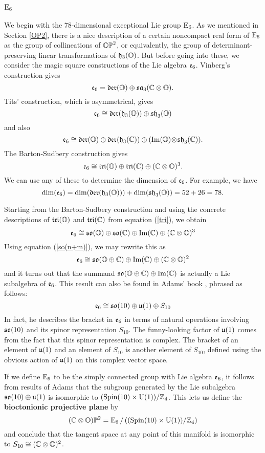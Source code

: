 \subsection{${\rm E}_6$}   \label{E6}   

We begin with the 78-dimensional exceptional Lie group ${\rm E}_6$.     
As we mentioned in Section \ref{OP2}, there is a nice description of a 
certain noncompact real form of ${\rm E}_6$ as the group of collineations
of ${\mathbb {OP}}^2$, or equivalently, the group of determinant-preserving 
linear transformations of ${\mathfrak {h}}_3({\mathbb O})$.  But before going into these,
we consider the magic square constructions of the Lie algebra ${\mathfrak {e}}_6$.
Vinberg's construction gives 
\[
{\mathfrak {e}}_6 = {\mathfrak {der}}({\mathbb O}) \oplus {\mathfrak {sa}}_3({\mathbb C} \otimes {\mathbb O})  .
\label{e6.1}
\]
Tits' construction, which is asymmetrical, gives
\[
{\mathfrak {e}}_6 \cong {\mathfrak {der}}({\mathfrak {h}}_3({\mathbb O})) \oplus {\mathfrak {sh}}_3({\mathbb O})  
\label{e6.2}
\]
and also
\[
{\mathfrak {e}}_6 \cong {\mathfrak {der}}({\mathbb O}) \oplus {\mathfrak {der}}({\mathfrak {h}}_3({\mathbb C})) \oplus    
({\rm Im}({\mathbb O}) \!\otimes \! {\mathfrak {sh}}_3({\mathbb C}))  .
\label{e6.3}
\]
The Barton-Sudbery construction gives
\[
{\mathfrak {e}}_6 \cong {\mathfrak {tri}}({\mathbb O}) \oplus {\mathfrak {tri}}({\mathbb C}) \oplus ({\mathbb C} \otimes {\mathbb O})^3 .
\label{e6.4}
\]
We can use any of these to determine the dimension of ${\mathfrak {e}}_6$.   For
example, we have 
\[ \dim({\mathfrak {e}}_6) = \dim({\mathfrak {der}}({\mathfrak {h}}_3({\mathbb O}))) + \dim({\mathfrak {sh}}_3({\mathbb O})) = 52 + 26 = 78. \]

Starting from the Barton-Sudbery construction and using the concrete
descriptions of ${\mathfrak {tri}}({\mathbb O})$ and ${\mathfrak {tri}}({\mathbb C})$ from equation
(\ref{tri}), we obtain
\[
{\mathfrak {e}}_6 \cong {\mathfrak {so}}({\mathbb O}) \oplus {\mathfrak {so}}({\mathbb C}) \oplus {\rm Im}({\mathbb C}) \oplus ({\mathbb C} \otimes {\mathbb O})^3 
\label{e6.5}
\]
Using equation (\ref{so(n+m)}), we may rewrite this as
\[
{\mathfrak {e}}_6 \cong {\mathfrak {so}}({\mathbb O} \oplus {\mathbb C}) \oplus {\rm Im}({\mathbb C}) \oplus ({\mathbb C} \otimes {\mathbb O})^2
\label{e6.6}
\]
and it turns out that the summand ${\mathfrak {so}}({\mathbb O} \oplus {\mathbb C}) \oplus {\rm Im}({\mathbb C})$ is 
actually a Lie subalgebra of ${\mathfrak {e}}_6$.  This result can also be found in 
Adams' book \cite{Adams}, phrased as follows: 
\[
{\mathfrak {e}}_6 \cong {\mathfrak {so}}(10) \oplus {\mathfrak {u}}(1) \oplus S_{10}
\label{e6.7}
\]
In fact, he describes the bracket in ${\mathfrak {e}}_6$ in terms of natural
operations involving ${\mathfrak {so}}(10)$ and its spinor representation $S_{10}$. 
The funny-looking factor of ${\mathfrak {u}}(1)$ comes from the fact that this spinor
representation is complex.  The bracket of an element of ${\mathfrak {u}}(1)$ and
an element of $S_{10}$ is another element of $S_{10}$, defined using
the obvious action of ${\mathfrak {u}}(1)$ on this complex vector space.  

If we define ${\rm E}_6$ to be the simply connected group with Lie algebra
${\mathfrak {e}}_6$, it follows from results of Adams that the subgroup generated by
the Lie subalgebra ${\mathfrak {so}}(10) \oplus {\mathfrak {u}}(1)$ is isomorphic to  $({\rm Spin}(10)
\times {\rm U}(1))/{\mathbb Z}_4$.  This lets us define the {\bf bioctonionic
projective plane} by
\[     ({\mathbb C} \otimes {\mathbb O}){\mathbb P}^2 = {\rm E}_6\, / \, (({\rm Spin}(10) \times {\rm U}(1))/{\mathbb Z}_4) \]
and conclude that the tangent space at any point of this manifold is
isomorphic to $S_{10} \cong ({\mathbb C} \otimes {\mathbb O})^2$.  

